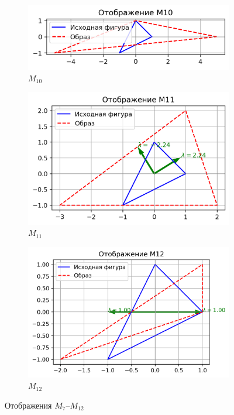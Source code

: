 \begin{figure}[H]
  \begin{subfigure}[b]{0.3\textwidth}
    \includegraphics[width=\linewidth]{plots/M10.png}
    \caption{$M_{10}$}
  \end{subfigure}\hfill
  \begin{subfigure}[b]{0.3\textwidth}
    \includegraphics[width=\linewidth]{plots/M11.png}
    \caption{$M_{11}$}
  \end{subfigure}\hfill
  \begin{subfigure}[b]{0.3\textwidth}
    \includegraphics[width=\linewidth]{plots/M12.png}
    \caption{$M_{12}$}
  \end{subfigure}
  \caption{Отображения $M_7$–$M_{12}$}
\end{figure}

